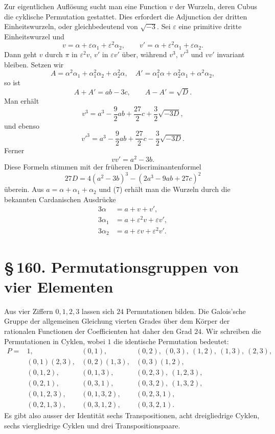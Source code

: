 \documentclass[11pt]{article}
\providecommand{\sect}[2]{\section*{\S\,#1. #2}}
\begin{document}
Zur eigentlichen Auflösung sucht man eine Function $v$ der Wurzeln, deren Cubus die cyklische Permutation gestattet. Dies erfordert die Adjunction der dritten Einheitswurzeln, oder gleichbedeutend von $\sqrt{-3}$. Sei $\varepsilon$ eine primitive dritte Einheitswurzel und
\[
        v=\alpha+\varepsilon\alpha_1+\varepsilon^2\alpha_2,
        \qquad
        v'=\alpha+\varepsilon^2\alpha_1+\varepsilon\alpha_2.
\tag{7}
\]
Dann geht $v$ durch $\pi$ in $\varepsilon^2v$, $v'$ in $\varepsilon v'$ über, während $v^3$, $v'^3$ und $vv'$ invariant bleiben. Setzen wir
\[
        A=\alpha^2\alpha_1+
\alpha_1^2\alpha_2+
\alpha_2^2\alpha,
\quad
        A'=\alpha_1^2\alpha+
\alpha_2^2\alpha_1+
\alpha^2\alpha_2,
\]
so ist
\[
        A+A'=ab-3c,
\qquad
        A-A'=\sqrt D.
\]
Man erhält
\[
        v^3=a^3-\frac{9}{2}ab+\frac{27}{2}c+\frac{3}{2}\sqrt{-3D},
\tag{8}
\]
und ebenso
\[
        v'^3=a^3-\frac{9}{2}ab+\frac{27}{2}c-\frac{3}{2}\sqrt{-3D}.
\tag{9}
\]
Ferner
\[
        vv'=a^2-3b.
\tag{10}
\]
Diese Formeln stimmen mit der früheren Discriminantenformel
\[
        27D=4(a^2-3b)^3-(2a^3-9ab+27c)^2
\]
überein. Aus $a=\alpha+
\alpha_1+
\alpha_2$ und (7) erhält man die Wurzeln durch die bekannten Cardanischen Ausdrücke
\[
\begin{aligned}
        3\alpha&=a+v+v',\\
        3\alpha_1&=a+\varepsilon^2v+\varepsilon v',\\
        3\alpha_2&=a+\varepsilon v+\varepsilon^2v'.
\end{aligned}
\]

\sect{160}{Permutationsgruppen von vier Elementen}

Aus vier Ziffern $0,1,2,3$ lassen sich $24$ Permutationen bilden. Die Galois'sche Gruppe der allgemeinen Gleichung vierten Grades über dem Körper der rationalen Functionen der Coefficienten hat daher den Grad $24$. Wir schreiben die Permutationen in Cyklen, wobei $1$ die identische Permutation bedeutet:
\[
\begin{array}{llll}
P=&1,&(0,1),&(0,2),\ (0,3),\ (1,2),\ (1,3),\ (2,3),\\
  &(0,1)(2,3),&(0,2)(1,3),&(0,3)(1,2),\\
  &(0,1,2),&(0,1,3),&(0,2,3),\ (1,2,3),\\
  &(0,2,1),&(0,3,1),&(0,3,2),\ (1,3,2),\\
  &(0,1,2,3),&(0,1,3,2),&(0,2,3,1),\\
  &(0,2,1,3),&(0,3,1,2),&(0,3,2,1).
\end{array}
\tag{1}
\]
Es gibt also ausser der Identität sechs Transpositionen, acht dreigliedrige Cyklen, sechs viergliedrige Cyklen und drei Transpositionspaare.
\end{document}
